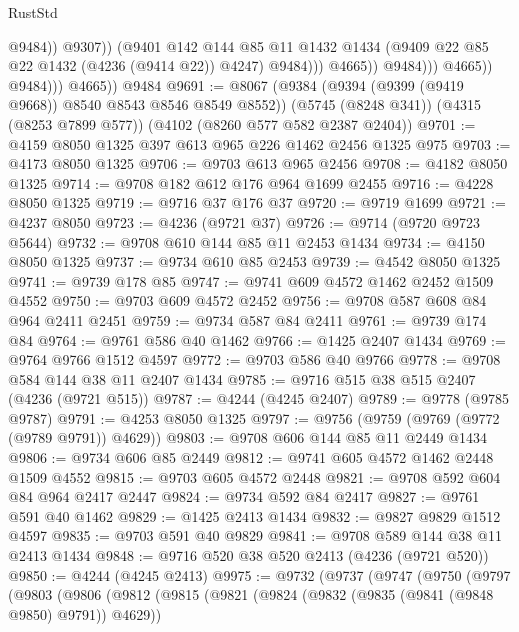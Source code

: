 \begin{lexlean}{RustStd}
\begin{coremodule}
                                        @9484))
                                    @9307))
                                (@9401
                                  @142
                                  @144
                                  @85
                                  @11
                                  @1432
                                  @1434
                                  (@9409 @22 @85 @22 @1432 (@4236 (@9414 @22)) @4247)
                                  @9484)))
                            @4665))
                        @9484)))
                  @4665))
              @9484)))
        @4665))
    @9484
@9691 := @8067
    (@9384 (@9394 (@9399 (@9419 @9668)) @8540 @8543 @8546 @8549 @8552))
    (@5745 (@8248 @341))
    (@4315 (@8253 @7899 @577))
    (@4102 (@8260 @577 @582 @2387 @2404))
@9701 := @4159 @8050 @1325 @397 @613 @965 @226 @1462 @2456 @1325 @975
@9703 := @4173 @8050 @1325
@9706 := @9703 @613 @965 @2456
@9708 := @4182 @8050 @1325
@9714 := @9708 @182 @612 @176 @964 @1699 @2455
@9716 := @4228 @8050 @1325
@9719 := @9716 @37 @176 @37
@9720 := @9719 @1699
@9721 := @4237 @8050
@9723 := @4236 (@9721 @37)
@9726 := @9714 (@9720 @9723 @5644)
@9732 := @9708 @610 @144 @85 @11 @2453 @1434
@9734 := @4150 @8050 @1325
@9737 := @9734 @610 @85 @2453
@9739 := @4542 @8050 @1325
@9741 := @9739 @178 @85
@9747 := @9741 @609 @4572 @1462 @2452 @1509 @4552
@9750 := @9703 @609 @4572 @2452
@9756 := @9708 @587 @608 @84 @964 @2411 @2451
@9759 := @9734 @587 @84 @2411
@9761 := @9739 @174 @84
@9764 := @9761 @586 @40 @1462
@9766 := @1425 @2407 @1434
@9769 := @9764 @9766 @1512 @4597
@9772 := @9703 @586 @40 @9766
@9778 := @9708 @584 @144 @38 @11 @2407 @1434
@9785 := @9716 @515 @38 @515 @2407 (@4236 (@9721 @515))
@9787 := @4244 (@4245 @2407)
@9789 := @9778 (@9785 @9787)
@9791 := @4253 @8050 @1325
@9797 := @9756 (@9759 (@9769 (@9772 (@9789 @9791)) @4629))
@9803 := @9708 @606 @144 @85 @11 @2449 @1434
@9806 := @9734 @606 @85 @2449
@9812 := @9741 @605 @4572 @1462 @2448 @1509 @4552
@9815 := @9703 @605 @4572 @2448
@9821 := @9708 @592 @604 @84 @964 @2417 @2447
@9824 := @9734 @592 @84 @2417
@9827 := @9761 @591 @40 @1462
@9829 := @1425 @2413 @1434
@9832 := @9827 @9829 @1512 @4597
@9835 := @9703 @591 @40 @9829
@9841 := @9708 @589 @144 @38 @11 @2413 @1434
@9848 := @9716 @520 @38 @520 @2413 (@4236 (@9721 @520))
@9850 := @4244 (@4245 @2413)
@9975 := @9732
    (@9737
      (@9747
        (@9750
          (@9797
            (@9803
              (@9806
                (@9812
                  (@9815
                    (@9821
                      (@9824 (@9832 (@9835 (@9841 (@9848 @9850) @9791)) @4629))

\end{coremodule}
\end{lexlean}
